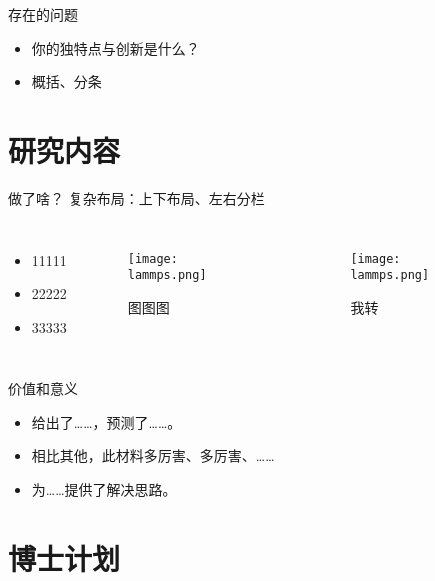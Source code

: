 \documentclass{ldr-simple-gray}
\begin{document}
\begin{frame}{存在的问题}
    
    \begin{itemize}
        \item 你的独特点与创新是什么？
        \item 概括、分条
    \end{itemize}
\end{frame}

\section{研究内容}

\begin{frame}{做了啥？}
    复杂布局：上下布局、左右分栏

    \begin{columns}
    \begin{itemize}
        \item 11111
        \item 22222
        \item 33333
    \end{itemize}

    \begin{figure}
        \texttt{[image: lammps.png]}
        \caption{图图图}
    \end{figure}

    \begin{figure}
        \texttt{[image: lammps.png]}
        \caption{我转}
    \end{figure}

\end{columns}

\end{frame}


\begin{frame}{价值和意义}
    
    \begin{itemize}
        \item 给出了……，预测了……。
        \item 相比其他，此材料\textcolor{Logo2}{多厉害、多厉害、……}
        \item 为……提供了解决思路。
    \end{itemize}
    
\end{frame}

\section{博士计划}
\end{document}
